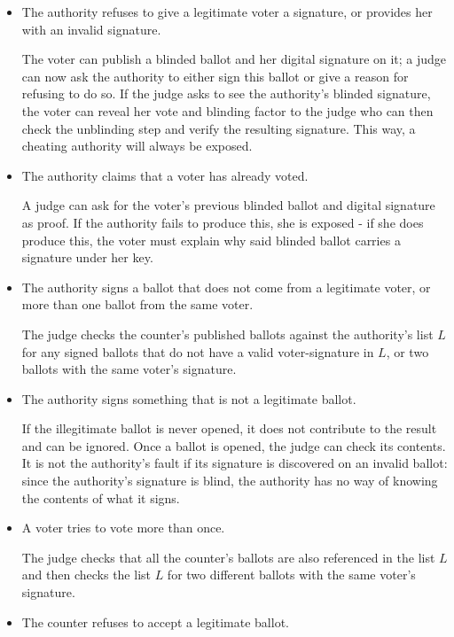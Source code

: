 \documentclass{llncs}
\begin{document}
\begin{itemize}
\item The authority refuses to give a legitimate voter a signature, or provides
her with an invalid signature.

The voter can publish a blinded ballot and her digital signature on it;
a judge can now ask the authority to either sign this ballot or give a reason
for refusing to do so. If the judge asks to see the authority's blinded
signature, the voter can reveal her vote and blinding factor to the judge who
can then check the unblinding step and verify the resulting signature.
This way, a cheating authority will always be exposed.

\item The authority claims that a voter has already voted.

A judge can ask for the voter's previous blinded ballot and digital signature as
proof. If the authority fails to produce this, she is exposed - if she does
produce this, the voter must explain why said blinded ballot carries a signature
under her key.

\item The authority signs a ballot that does not come from a legitimate voter,
or more than one ballot from the same voter.

The judge checks the counter's published ballots against the authority's list
$L$ for any signed ballots that do not have a valid voter-signature in $L$, or
two ballots with the same voter's signature.

\item The authority signs something that is not a legitimate ballot.

If the illegitimate ballot is never opened, it does not contribute to the result
and can be ignored. Once a ballot is opened, the judge can check its contents.
It is not the authority's fault if its signature is discovered on an invalid
ballot: since the authority's signature is blind, the authority has no way of
knowing the contents of what it signs.

\item A voter tries to vote more than once.

The judge checks that all the counter's ballots are also referenced in the list
$L$ and then checks the list $L$ for two different ballots with the same voter's
signature.

\item The counter refuses to accept a legitimate ballot.


\end{itemize}
\end{document}
